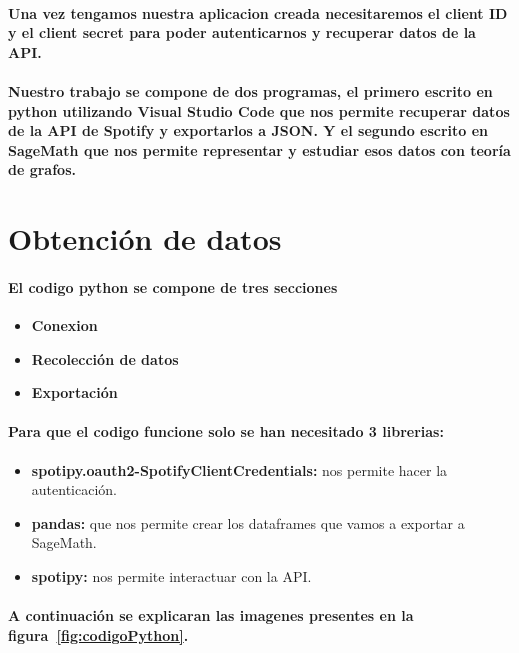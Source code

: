 \documentclass[11pt,spanish]{article}
\begin{document}
\paragraph*{Una vez tengamos nuestra aplicacion creada necesitaremos el client ID y el client secret para poder autenticarnos 
y recuperar datos de la API.}

\paragraph*{Nuestro trabajo se compone de dos programas, el primero escrito en python utilizando Visual Studio Code
que nos permite recuperar datos de la API de Spotify y exportarlos a JSON. 
Y el segundo escrito en SageMath que nos permite representar y estudiar esos datos con teoría de grafos.}

\section{Obtención de datos}

\paragraph*{El codigo python se compone de tres secciones}
\begin{itemize}
	\item \textbf{Conexion}
	\item \textbf{Recolección de datos}
	\item \textbf{Exportación}
\end{itemize}

\paragraph*{Para que el codigo funcione solo se han necesitado 3 librerias:}
\begin{itemize}
	\item \textbf{spotipy.oauth2-SpotifyClientCredentials:} nos permite hacer la autenticación.
	\item \textbf{pandas:} que nos permite crear los dataframes que vamos a exportar a SageMath.
	\item \textbf{spotipy:} nos permite interactuar con la API.
\end{itemize}
\paragraph*{A continuación se explicaran las imagenes presentes en la figura~\ref{fig:codigoPython}.}
\end{document}
